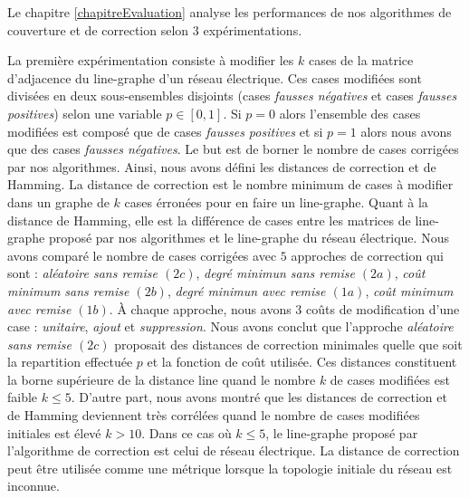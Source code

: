 Le chapitre \ref{chapitreEvaluation} analyse les performances de nos algorithmes de couverture et de correction selon $3$ exp\'erimentations. 

La premi\`ere exp\'erimentation consiste \`a modifier les $k$ cases de la matrice d'adjacence du line-graphe d'un r\'eseau \'electrique. Ces cases modifi\'ees sont divis\'ees en deux sous-ensembles disjoints (cases {\em fausses n\'egatives} et cases {\em fausses positives}) selon une variable $p \in [0,1]$. Si $p = 0$ alors l'ensemble des cases modifi\'ees est compos\'e que de cases  {\em fausses positives} et si $p=1$ alors nous avons que des cases {\em fausses n\'egatives}. 
Le but est de borner le nombre de cases corrig\'ees par nos algorithmes.
Ainsi, nous avons d\'efini les distances de correction et de Hamming. 
La distance de correction est le nombre minimum de cases \`a modifier dans un graphe de $k$ cases \'erron\'ees pour en faire un line-graphe. 
Quant \`a la distance de Hamming, elle est la diff\'erence de cases entre les matrices de line-graphe propos\'e par nos algorithmes et le line-graphe du r\'eseau \'electrique.
Nous avons compar\'e le nombre de cases corrig\'ees avec $5$ approches de correction qui sont : {\em al\'eatoire sans remise $(2c)$}, {\em degr\'e minimun sans remise $(2a)$}, {\em co\^ut minimum sans remise $(2b)$}, {\em degr\'e minimun avec remise $(1a)$}, {\em co\^ut minimum avec remise $(1b)$}. \`A chaque approche, nous avons $3$ co\^uts de modification  d'une case : {\em unitaire}, {\em ajout} et {\em suppression}.
Nous avons conclut que l'approche  {\em al\'eatoire sans remise $(2c)$} proposait des distances de correction minimales quelle que soit la repartition effectu\'ee $p$ et la fonction de co\^ut utilis\'ee. Ces distances constituent la borne sup\'erieure de la distance line quand le nombre $k$ de cases modifi\'ees est faible $k \le 5$. 
D'autre part, nous avons montr\'e que les distances de correction et de Hamming deviennent tr\`es corr\'el\'ees quand le nombre de cases modifi\'ees initiales est \'elev\'e $k > 10$. Dans ce cas o\`u $k \le 5$, le line-graphe propos\'e par l'algorithme de correction est celui de r\'eseau \'electrique. La distance de correction peut \^etre utilis\'ee comme une m\'etrique lorsque la topologie initiale du r\'eseau est inconnue.
\newline

